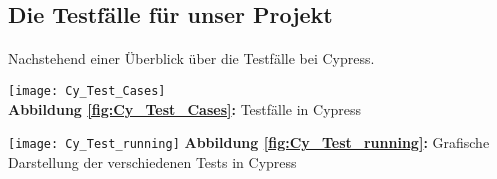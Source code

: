 
\subsection{Die Testfälle für unser Projekt}
\paragraph{}
Nachstehend einer Überblick über die Testfälle bei Cypress.
\\
\begin{center}
\texttt{[image: Cy\_Test\_Cases]}\label{fig:Cy_Test_Cases}\\
\textbf{Abbildung \autoref{fig:Cy_Test_Cases}:} Testfälle in Cypress
\end{center}


\texttt{[image: Cy\_Test\_running]}\label{fig:Cy_Test_running}
\textbf{Abbildung \autoref{fig:Cy_Test_running}:} Grafische Darstellung der verschiedenen Tests in Cypress

